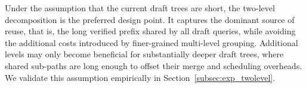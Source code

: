 \documentclass{article}
\begin{document}
Under the assumption that the current draft trees are short, the two-level decomposition is the preferred design point. It captures the dominant source of reuse, that is, the long verified prefix shared by all draft queries, while avoiding the additional costs introduced by finer-grained multi-level grouping. Additional levels may only become beneficial for substantially deeper draft trees, where shared sub-paths are long enough to offset their merge and scheduling overheads. We validate this assumption empirically in Section~\ref{subsec:exp_twolevel}.

\end{document}
